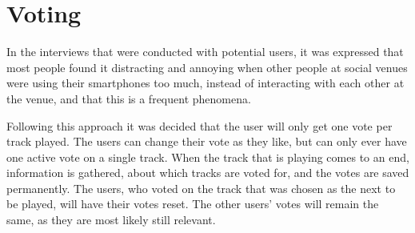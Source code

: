 \section{Voting}
\label{VotingAndRequesting}
In the interviews that were conducted with potential users, it was expressed that most people found it distracting and annoying when other people at social venues were using their smartphones too much, instead of interacting with each other at the venue, and that this is a frequent phenomena.

Following this approach it was decided that the user will only get one vote per track played.
The users can change their vote as they like, but can only ever have one active vote on a single track.
When the track that is playing comes to an end, information is gathered, about which tracks are voted for, and the votes are saved permanently.
The users, who voted on the track that was chosen as the next to be played, will have their votes reset. The other users’ votes will remain the same, as they are most likely still relevant.
